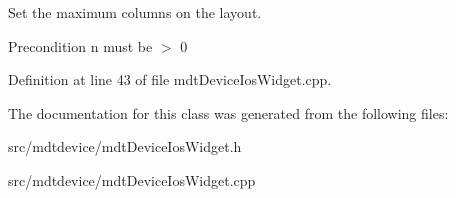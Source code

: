 Set the maximum columns on the layout. 

\begin{DoxyPrecond}{Precondition}
n must be $>$ 0 
\end{DoxyPrecond}


Definition at line 43 of file mdtDeviceIosWidget.cpp.



The documentation for this class was generated from the following files:\begin{DoxyCompactItemize}
\item 
src/mdtdevice/mdtDeviceIosWidget.h\item 
src/mdtdevice/mdtDeviceIosWidget.cpp\end{DoxyCompactItemize}
